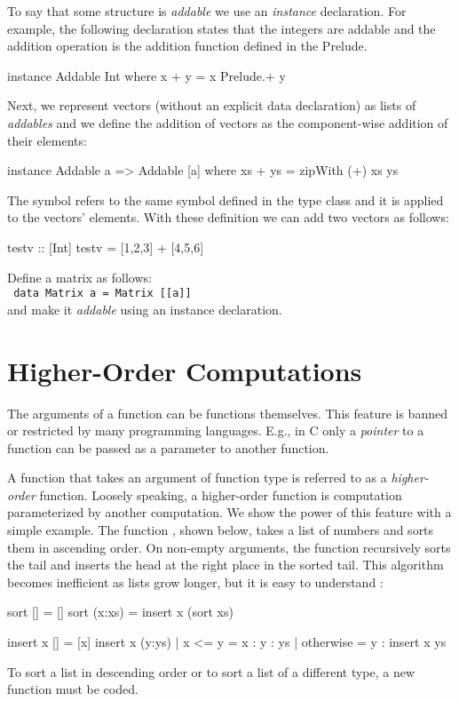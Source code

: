 To say that some structure is \emph{addable} we use an \emph{instance}
declaration.  For example, the following declaration
states that the integers are addable
and the addition operation is the addition function defined in the Prelude.
%
\begin{curry}
instance Addable Int where
  x + y = x Prelude.+ y
\end{curry}
%
Next, we represent vectors (without an explicit data declaration)
as lists of \emph{addables} and we define the addition of vectors
as the component-wise addition of their elements:
%
\begin{curry}
instance Addable a => Addable [a] where
  xs + ys = zipWith (+) xs ys
\end{curry}
%
The symbol \ccode{+} refers to the same symbol defined in the
 type class and it is applied to the vectors' elements.
With these definition we can add two vectors as follows:
%
\begin{curry}
testv :: [Int]
testv = [1,2,3] + [4,5,6]
\end{curry}
%
\begin{exercise}
  Define a matrix as follows:
  \\[2ex]
  {\tt  \phantom{WWW} data Matrix a = Matrix [[a]]}
  \\[2ex]
  and make it \emph{addable} using an instance declaration.
\end{exercise}

\section{Higher-Order Computations}
\label{Higher-Order}

The arguments of a function can be functions themselves.
This feature is banned or restricted by many programming languages.
E.g., in C only a \emph{pointer} to a function can be passed
as a parameter to another function. 

A function that takes an argument of function type is referred
to as a \emph{higher-order} function.
Loosely speaking, a higher-order function is computation parameterized
by another computation.
We show the power of this feature with a simple example.
The function , shown below,
takes a list of numbers and sorts them in ascending order.
On non-empty arguments, the function  recursively sorts the tail
and inserts the head at the right place in the sorted tail.
This algorithm becomes inefficient as lists grow longer,
but it is easy to understand
:\label{InsertSort}
%
\begin{curry}
sort []     = []
sort (x:xs) = insert x (sort xs)

insert x [] = [x]
insert x (y:ys) | x <= y    = x : y : ys
                | otherwise = y : insert x ys
\end{curry}
%
To sort a list in descending order or to sort a list
of a different type, a new function must be coded.

